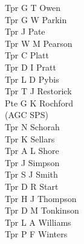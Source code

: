 \begin{multicols}{3}
  Tpr G T Owen \\
  Tpr G W Parkin \\
  Tpr J Pate \\
  Tpr W M Pearson \\
  Tpr C Platt \\
  Tpr D I Pratt \\
  Tpr L D Pybis \\
  Tpr T J Restorick \\
  Pte G K Rochford \\ \indent (AGC SPS) \\
  Tpr N Schorah \\
  Tpr K Sellars \\
  Tpr A L Shore \\
  Tpr J Simpson \\
  Tpr S J Smith \\
  Tpr D R Start \\
  Tpr H J Thompson \\
  Tpr D M Tonkinson \\
  Tpr L A Williams \\
  Tpr P F Winters
\end{multicols}

\pagebreak
